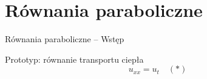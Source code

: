 \section{Równania paraboliczne}

\begin{frame}{Równania paraboliczne -- Wstęp}
  \begin{block}{Prototyp: równanie transportu ciepła}
    $$ u_{x x} = u_t \quad (*) $$
  \end{block}
\end{frame}
